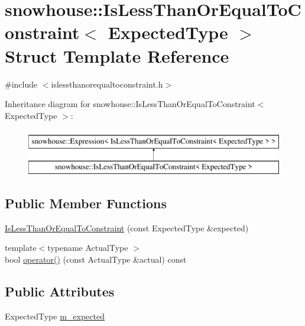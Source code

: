 \hypertarget{structsnowhouse_1_1IsLessThanOrEqualToConstraint}{}\section{snowhouse\+::Is\+Less\+Than\+Or\+Equal\+To\+Constraint$<$ Expected\+Type $>$ Struct Template Reference}
\label{structsnowhouse_1_1IsLessThanOrEqualToConstraint}


{\ttfamily \#include $<$islessthanorequaltoconstraint.\+h$>$}

Inheritance diagram for snowhouse\+::Is\+Less\+Than\+Or\+Equal\+To\+Constraint$<$ Expected\+Type $>$\+:\begin{figure}[H]
\begin{center}
\leavevmode
\includegraphics[height=2.000000cm]{structsnowhouse_1_1IsLessThanOrEqualToConstraint}
\end{center}
\end{figure}
\subsection*{Public Member Functions}
\begin{DoxyCompactItemize}
\item 
\mbox{\hyperlink{structsnowhouse_1_1IsLessThanOrEqualToConstraint_a7381f49a45cdcf9e3b5c9c8b96f9db32}{Is\+Less\+Than\+Or\+Equal\+To\+Constraint}} (const Expected\+Type \&expected)
\item 
{\footnotesize template$<$typename Actual\+Type $>$ }\\bool \mbox{\hyperlink{structsnowhouse_1_1IsLessThanOrEqualToConstraint_ac7126ec8f96b4ab989bbb4cf43c34b1e}{operator()}} (const Actual\+Type \&actual) const
\end{DoxyCompactItemize}
\subsection*{Public Attributes}
\begin{DoxyCompactItemize}
\item 
Expected\+Type \mbox{\hyperlink{structsnowhouse_1_1IsLessThanOrEqualToConstraint_a1f36ca48b4deb7336c258994e14016d8}{m\+\_\+expected}}
\end{DoxyCompactItemize}


